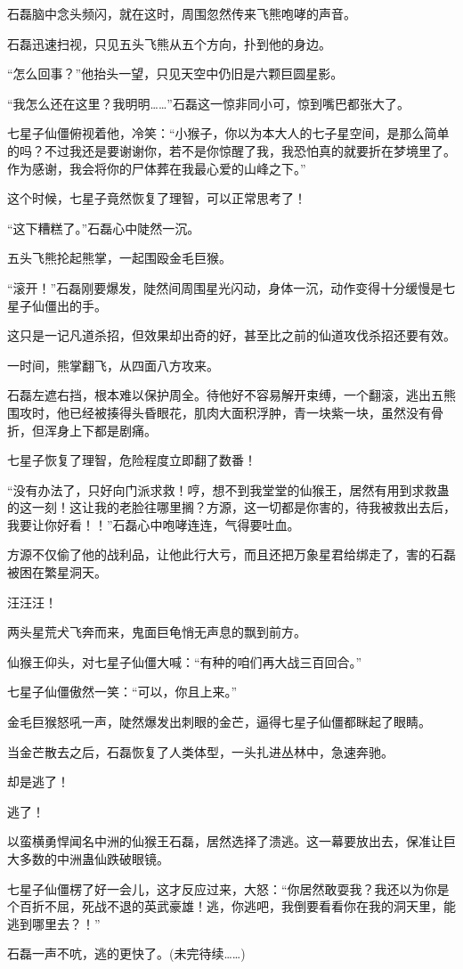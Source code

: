 \begin{this_body}
石磊脑中念头频闪，就在这时，周围忽然传来飞熊咆哮的声音。

石磊迅速扫视，只见五头飞熊从五个方向，扑到他的身边。

“怎么回事？”他抬头一望，只见天空中仍旧是六颗巨圆星影。

“我怎么还在这里？我明明……”石磊这一惊非同小可，惊到嘴巴都张大了。

七星子仙僵俯视着他，冷笑：“小猴子，你以为本大人的七子星空间，是那么简单的吗？不过我还是要谢谢你，若不是你惊醒了我，我恐怕真的就要折在梦境里了。作为感谢，我会将你的尸体葬在我最心爱的山峰之下。”

这个时候，七星子竟然恢复了理智，可以正常思考了！

“这下糟糕了。”石磊心中陡然一沉。

五头飞熊抡起熊掌，一起围殴金毛巨猴。

“滚开！”石磊刚要爆发，陡然间周围星光闪动，身体一沉，动作变得十分缓慢是七星子仙僵出的手。

这只是一记凡道杀招，但效果却出奇的好，甚至比之前的仙道攻伐杀招还要有效。

一时间，熊掌翻飞，从四面八方攻来。

石磊左遮右挡，根本难以保护周全。待他好不容易解开束缚，一个翻滚，逃出五熊围攻时，他已经被揍得头昏眼花，肌肉大面积浮肿，青一块紫一块，虽然没有骨折，但浑身上下都是剧痛。

七星子恢复了理智，危险程度立即翻了数番！

“没有办法了，只好向门派求救！哼，想不到我堂堂的仙猴王，居然有用到求救蛊的这一刻！这让我的老脸往哪里搁？方源，这一切都是你害的，待我被救出去后，我要让你好看！！”石磊心中咆哮连连，气得要吐血。

方源不仅偷了他的战利品，让他此行大亏，而且还把万象星君给绑走了，害的石磊被困在繁星洞天。

汪汪汪！

两头星荒犬飞奔而来，鬼面巨龟悄无声息的飘到前方。

仙猴王仰头，对七星子仙僵大喊：“有种的咱们再大战三百回合。”

七星子仙僵傲然一笑：“可以，你且上来。”

金毛巨猴怒吼一声，陡然爆发出刺眼的金芒，逼得七星子仙僵都眯起了眼睛。

当金芒散去之后，石磊恢复了人类体型，一头扎进丛林中，急速奔驰。

却是逃了！

逃了！

以蛮横勇悍闻名中洲的仙猴王石磊，居然选择了溃逃。这一幕要放出去，保准让巨大多数的中洲蛊仙跌破眼镜。

七星子仙僵楞了好一会儿，这才反应过来，大怒：“你居然敢耍我？我还以为你是个百折不屈，死战不退的英武豪雄！逃，你逃吧，我倒要看看你在我的洞天里，能逃到哪里去？！”

石磊一声不吭，逃的更快了。(未完待续……)

\end{this_body}

